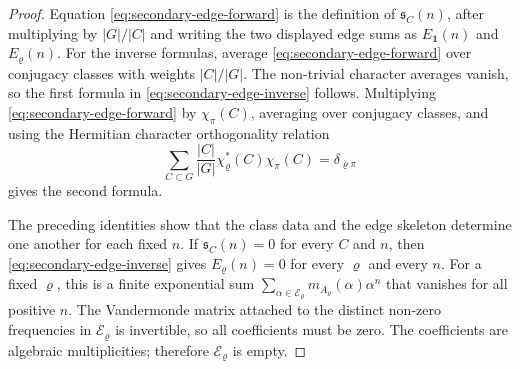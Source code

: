 \begin{proof}
  Equation \eqref{eq:secondary-edge-forward} is the definition of
  \(\mathfrak s_C(n)\), after multiplying by \(|G|/|C|\) and writing the
  two displayed edge sums as \(E_{\mathbf1}(n)\) and \(E_\varrho(n)\).
  For the inverse formulas, average
  \eqref{eq:secondary-edge-forward} over conjugacy classes with weights
  \(|C|/|G|\). The non-trivial character averages vanish, so the first
  formula in \eqref{eq:secondary-edge-inverse} follows. Multiplying
  \eqref{eq:secondary-edge-forward} by \(\chi_\pi(C)\), averaging over
  conjugacy classes, and using the Hermitian character orthogonality
  relation
  \[
    \sum_{C\subset G}\frac{|C|}{|G|}
      \chi_\varrho^\ast(C)\chi_\pi(C)=\delta_{\varrho\pi}
  \]
  gives the second formula.

  The preceding identities show that the class data and the edge
  skeleton determine one another for each fixed \(n\). If
  \(\mathfrak s_C(n)=0\) for every \(C\) and \(n\), then
  \eqref{eq:secondary-edge-inverse} gives \(E_\varrho(n)=0\) for every
  \(\varrho\) and every \(n\). For a fixed \(\varrho\), this is a finite
  exponential sum
  \(\sum_{\alpha\in\mathcal E_\varrho}m_{A_\varrho}(\alpha)\alpha^n\)
  that vanishes for all positive \(n\). The Vandermonde matrix attached
  to the distinct non-zero frequencies in \(\mathcal E_\varrho\) is
  invertible, so all coefficients must be zero. The coefficients are
  algebraic multiplicities; therefore \(\mathcal E_\varrho\) is empty.
\end{proof}

